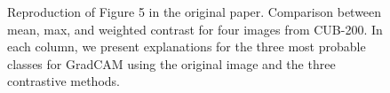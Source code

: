 \begin{figure}[t]
\begin{tabular}
    

\bottomrule
\end{tabular}
\caption{Reproduction of Figure 5 in the original paper. Comparison between mean, max, and weighted contrast for four images from CUB-200. In each column, we present explanations for the three most probable classes for GradCAM using the original image and the three contrastive methods.} \label{f:meanmaxcomp}
\end{figure}